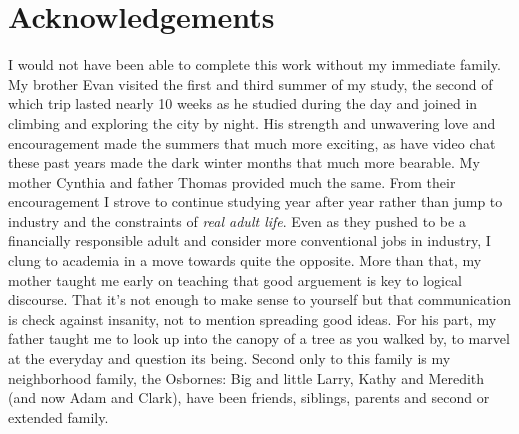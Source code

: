 

\chapter{Acknowledgements}

I would not have been able to complete this work without my immediate family. My brother Evan visited the first and third summer of my study, the second of which trip lasted nearly 10 weeks as he studied during the day and joined in climbing and exploring the city by night. His strength and unwavering love and encouragement made the summers that much more exciting, as have video chat these past years made the dark winter months that much more bearable. My mother Cynthia and father Thomas provided much the same. From their encouragement I strove to continue studying year after year rather than jump to industry and the constraints of \emph{real adult life}. Even as they pushed to be a financially responsible adult and consider more conventional jobs in industry, I clung to academia in a move towards quite the opposite. More than that, my mother taught me early on teaching that good arguement is key to logical discourse. That it's not enough to make sense to yourself but that communication is check against insanity, not to mention spreading good ideas. For his part, my father taught me to look up into the canopy of a tree as you walked by, to marvel at the everyday and question its being. Second only to this family is my neighborhood family, the Osbornes: Big and little Larry, Kathy and Meredith (and now Adam and Clark), have been friends, siblings, parents and second or extended family.
